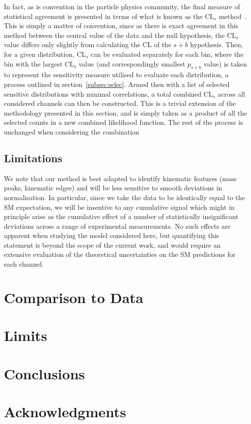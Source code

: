 \documentclass[floatfix]{article}
\begin{document}
In fact, as is convention in the particle physics community, the final measure of statistical agreement is presented in terms of what is known as the CL$_{s}$ 
method~\cite{Junk:1999kv,Read:2002hq}. This is simply a matter of convention, since as there is exact agreement in this method between the central value of the 
data and the null hypothesis, the CL$_{s}$ value differs only slightly from calculating the CL of the $s+b$ hypothesis. Then, for a given distribution, CL$_{s}$ 
can be evaluated separately for each bin, where the bin with the largest CL$_{s}$ value (and correspondingly smallest $p_{s+b}$ value) is taken to represent the 
sensitivity measure utilised to evaluate each distribution, a process outlined in section~\ref{subsec:selec}. Armed then with a list of selected sensitive 
distributions with minimal correlations, a total combined CL$_{s}$ across all considered channels can then be constructed. This is a trivial extension of 
the methodology presented in this section, and is simply taken as a product of all the selected counts in a new combined likelihood function. 
The rest of the process is unchanged when considering the combination


\subsection{Limitations}

We note that our method is best adapted to identify kinematic features (mass peaks, kinematic edges) and will be less sensitive to smooth
deviations in normalisation. In particular, since we take the data to be identically equal to the SM expectation, we will be insentive 
to any cumulative signal which might in principle arise as the cumulative effect of a number of statistically insignificant deviations 
across a range of experimental measurements.
No such effects are apparent when studying the model considered here, but quantifying this statement is beyond the scope of the current work, 
and would require an extensive evaluation of the theoretical uncertainties on the SM predictions for each channel.




\section{Comparison to Data}\label{sec:kinematics}


\section{Limits}\label{sec:limits}

\section{Conclusions}\label{sec:conclusions}

\section*{Acknowledgments}





\end{document}
